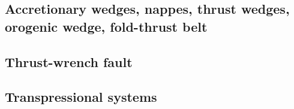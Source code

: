 {\scriptsize
\noindent
\cite{lejm08}
\cite{ligt09}\cite{gogk09}
\cite{vayb10}
\cite{ligt11}\cite{vacg11}
\cite{vagc13}
\cite{gobg14}\cite{yadl14}
\cite{neum19}\cite{vayu19}
}

\subsection{Accretionary wedges, nappes, thrust wedges, orogenic wedge, fold-thrust belt} 

{\scriptsize
\noindent
\cite{stoc83}\cite{dasd83}
\cite{dahl84}\cite{dasd84}
\cite{dahl90}
\cite{koon94}
\cite{wiep03}\cite{smbs03}\cite{muso03}\cite{vamf03}
\cite{simp06}\cite{yabm06}
\cite{rukb12}
\cite{rugb13}
\cite{mauw16}
\cite{mauw17}\cite{rugb17}
\cite{elgb19}\cite{meho19}\cite{meho19b}
}

\subsection{Thrust-wrench fault} 

{\scriptsize
\noindent
\cite{rods15}
}

\subsection{Transpressional systems} 

{\scriptsize
\noindent
\cite{tite94}
\cite{thsj97}
\cite{konc03}\cite{upke03}
\cite{legs11}
\cite{naam17}\cite{rugb17}
\cite{naam18}
}


